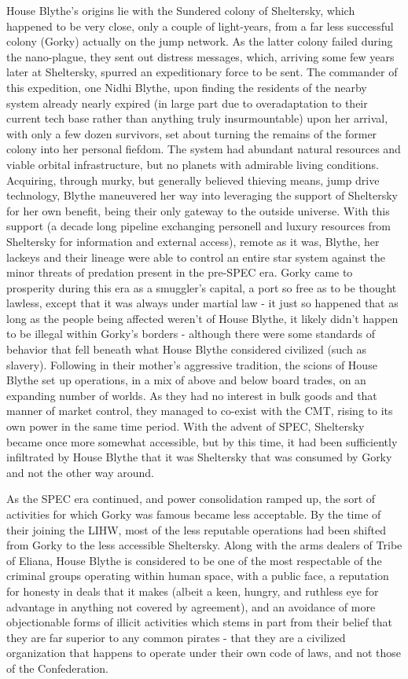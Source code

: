 \begin{itemize}
House Blythe's origins lie with the Sundered colony of Sheltersky,
which happened to be very close, only a couple of light-years, from a
far less successful colony (Gorky) actually on the jump network. As
the latter colony failed during the nano-plague, they sent out
distress messages, which, arriving some few years later at Sheltersky,
spurred an expeditionary force to be sent. The commander of this
expedition, one Nidhi Blythe, upon finding the residents of the nearby
system already nearly expired (in large part due to overadaptation to
their current tech base rather than anything truly insurmountable)
upon her arrival, with only a few dozen survivors, set about turning
the remains of the former colony into her personal fiefdom. The system
had abundant natural resources and viable orbital infrastructure, but
no planets with admirable living conditions. Acquiring, through murky,
but generally believed thieving means, jump drive technology, Blythe
maneuvered her way into leveraging the support of Sheltersky for her
own benefit, being their only gateway to the outside universe. With
this support (a decade long pipeline exchanging personell and luxury
resources from Sheltersky for information and external access), remote
as it was, Blythe, her lackeys and their lineage were able to control
an entire star system against the minor threats of predation present
in the pre-SPEC era. Gorky came to prosperity during this era as a
smuggler's capital, a port so free as to be thought lawless, except
that it was always under martial law - it just so happened that as
long as the people being affected weren't of House Blythe, it likely
didn't happen to be illegal within Gorky's borders - although there
were some standards of behavior that fell beneath what House Blythe
considered civilized (such as slavery). Following in their mother's
aggressive tradition, the scions of House Blythe set up operations, in
a mix of above and below board trades, on an expanding number of
worlds. As they had no interest in bulk goods and that manner of
market control, they managed to co-exist with the CMT, rising to its
own power in the same time period. With the advent of SPEC, Sheltersky
became once more somewhat accessible, but by this time, it had been
sufficiently infiltrated by House Blythe that it was Sheltersky that
was consumed by Gorky and not the other way around.

As the SPEC era continued, and power consolidation ramped up, the sort
of activities for which Gorky was famous became less acceptable. By
the time of their joining the LIHW, most of the less reputable
operations had been shifted from Gorky to the less accessible
Sheltersky. Along with the arms dealers of Tribe of Eliana, House
Blythe is considered to be one of the most respectable of the criminal
groups operating within human space, with a public face, a reputation
for honesty in deals that it makes (albeit a keen, hungry, and
ruthless eye for advantage in anything not covered by agreement), and
an avoidance of more objectionable forms of illicit activities which
stems in part from their belief that they are far superior to any
common pirates - that they are a civilized organization that happens
to operate under their own code of laws, and not those of the
Confederation.


\end{itemize}
